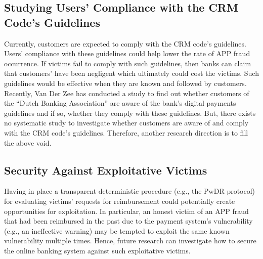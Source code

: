 \subsection{Studying Users' Compliance with the CRM Code's Guidelines}

Currently,  customers are expected to comply with the CRM code's guidelines.  Users'  compliance with these guidelines could help lower the rate of APP fraud occurrence.  If victims fail to comply with such guidelines, then banks can claim that customers' have been negligent which ultimately could cost the victims. Such guidelines would be effective when they are known and followed by customers. Recently, Van Der Zee \cite{zee2021shifting}  has conducted a study to find out whether customers of the ``Dutch Banking Association'' are aware of the bank's digital payments guidelines and if so, whether they comply with these guidelines.  But, there exists no systematic study to investigate whether customers are aware of and comply with the CRM code's guidelines. Therefore, another research direction is to fill the above void. 



\subsection{Security Against Exploitative Victims}



Having in place a transparent deterministic procedure (e.g.,  the PwDR protocol)  for evaluating victims' requests for reimbursement could potentially create opportunities for exploitation. In particular, an honest victim of an APP fraud that had been reimbursed in the past due to the payment system's vulnerability (e.g., an ineffective warning) may be tempted to exploit the same known vulnerability multiple times. Hence, future research can investigate how to secure the online banking system against such exploitative victims.











